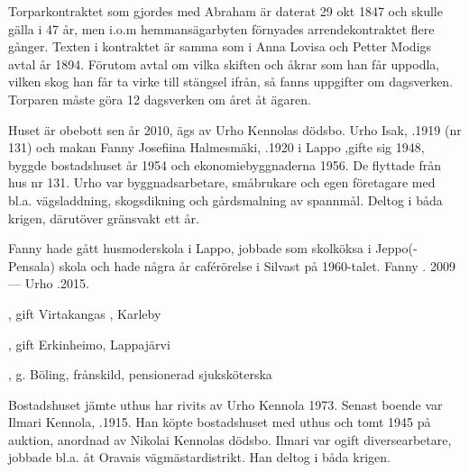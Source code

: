 Torparkontraktet som gjordes med Abraham är daterat 29 okt 1847 och skulle gälla i 47 år, men i.o.m hemmansägarbyten förnyades arrendekontraktet flere gånger. Texten i kontraktet är samma som i Anna Lovisa och Petter Modigs avtal år 1894. Förutom avtal om vilka skiften och åkrar som han får uppodla, vilken skog han får ta virke till stängsel ifrån, så fanns uppgifter om dagsverken. Torparen måste göra 12 dagsverken om året åt ägaren.






Huset är obebott sen år 2010, ägs av Urho Kennolas dödsbo. Urho Isak, .1919 (nr 131) och makan Fanny Josefiina Halmesmäki, .1920 i Lappo ,gifte sig 1948, byggde bostadshuset år 1954 och ekonomiebyggnaderna 1956. De flyttade från hus nr 131. Urho var byggnadsarbetare, småbrukare och egen företagare med bl.a. vägsladdning, skogsdikning och gårdsmalning av spannmål. Deltog i båda krigen, därutöver gränsvakt ett år.

Fanny hade gått husmoderskola i Lappo, jobbade som skolköksa i Jeppo(-Pensala) skola och hade några år caférörelse i Silvast på 1960-talet. Fanny . 2009  ---  Urho .2015.
\begin{jhchildren}
  \item {}, gift Virtakangas , Karleby
  \item {}, gift Erkinheimo, Lappajärvi
  \item {}, g. Böling, frånskild, pensionerad sjuksköterska
\end{jhchildren}






Bostadshuset jämte uthus har rivits av Urho Kennola 1973. Senast boende var Ilmari Kennola, .1915. Han köpte bostadshuset med uthus och tomt 1945 på auktion, anordnad av Nikolai Kennolas dödsbo. Ilmari var ogift diversearbetare, jobbade bl.a. åt Oravais vägmästardistrikt. Han deltog i båda krigen.

